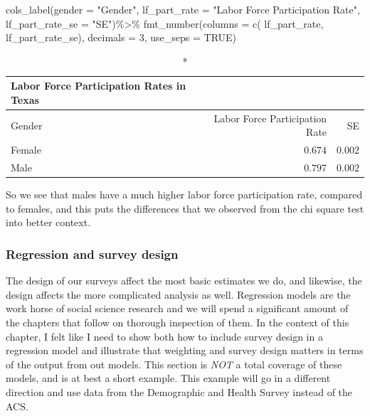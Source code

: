 \documentclass[
]{article}
\newenvironment{Shaded}{\begin{snugshade}}{\end{snugshade}}
\newcommand{\AttributeTok}[1]{\textcolor[rgb]{0.77,0.63,0.00}{#1}}
\newcommand{\ConstantTok}[1]{\textcolor[rgb]{0.00,0.00,0.00}{#1}}
\newcommand{\DecValTok}[1]{\textcolor[rgb]{0.00,0.00,0.81}{#1}}
\newcommand{\FunctionTok}[1]{\textcolor[rgb]{0.00,0.00,0.00}{#1}}
\newcommand{\NormalTok}[1]{#1}
\newcommand{\SpecialCharTok}[1]{\textcolor[rgb]{0.00,0.00,0.00}{#1}}
\newcommand{\StringTok}[1]{\textcolor[rgb]{0.31,0.60,0.02}{#1}}
\begin{document}
\begin{Shaded}
\begin{Highlighting}[]
    \FunctionTok{cols\_label}\NormalTok{(}\AttributeTok{gender =} \StringTok{"Gender"}\NormalTok{,}
                 \AttributeTok{lf\_part\_rate =} \StringTok{"Labor Force Participation Rate"}\NormalTok{,}
                \AttributeTok{lf\_part\_rate\_se =} \StringTok{"SE"}\NormalTok{)}\SpecialCharTok{\%\textgreater{}\%}
    \FunctionTok{fmt\_number}\NormalTok{(}\AttributeTok{columns =} \FunctionTok{c}\NormalTok{( lf\_part\_rate,  lf\_part\_rate\_se), }
                 \AttributeTok{decimals =} \DecValTok{3}\NormalTok{, }\AttributeTok{use\_seps =} \ConstantTok{TRUE}\NormalTok{)}
\end{Highlighting}
\end{Shaded}

\captionsetup[table]{labelformat=empty,skip=1pt}
\begin{longtable}{lrr}
\caption*{
{\large Labor Force Participation Rates in Texas}
} \\ 
\toprule
Gender & Labor Force Participation Rate & SE \\ 
\midrule
Female & $0.674$ & $0.002$ \\ 
Male & $0.797$ & $0.002$ \\ 
\bottomrule
\end{longtable}

So we see that males have a much higher labor force participation rate, compared to females, and this puts the differences that we observed from the chi square test into better context.

\hypertarget{regression-and-survey-design}{%
\subsubsection{Regression and survey design}\label{regression-and-survey-design}}

The design of our surveys affect the most basic estimates we do, and likewise, the design affects the more complicated analysis as well. Regression models are the work horse of social science research and we will spend a significant amount of the chapters that follow on thorough inspection of them. In the context of this chapter, I felt like I need to show both how to include survey design in a regression model and illustrate that weighting and survey design matters in terms of the output from out models. This section is \emph{NOT} a total coverage of these models, and is at best a short example. This example will go in a different direction and use data from the Demographic and Health Survey instead of the ACS.
\end{document}
